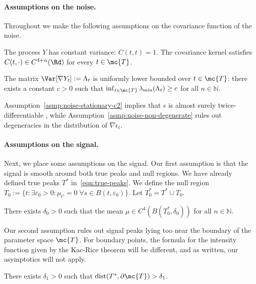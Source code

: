 \documentclass{article}
\newcommand{\ag}[1]{{\bf{{\red{[{AG: #1}]}}}}}
\begin{document}
	\paragraph{Assumptions on the noise.}
	Throughout we make the following assumptions on the covariance function of the noise. 
	\begin{assumption}
		\label{asmp:noise-stationary-c2}
		The process $Y$ has constant variance: $C(t,t) = 1$. The covariance kernel satisfies $C(t,\cdot) \in C^{4 + \alpha}(\Rd)$ for every $t \in \mc{T}$. 
	\end{assumption}
	\begin{assumption}
		\label{asmp:noise-non-degenerate}
		The matrix $\Var[\nabla Y_t] := \Lambda_t$ is uniformly lower bounded over $t \in \mc{T}$: there exists a constant $c > 0$ such that $\inf_{t \in \mc{T}} \lambda_{\min}(\Lambda_t) \geq c$ for all $n \in \mathbb{N}$.
	\end{assumption}
	Assumption~\ref{asmp:noise-stationary-c2} implies that $\epsilon$ is almost surely twice-differentiable \ag{Need to check this}, while Assumption~\ref{asmp:noise-non-degenerate} rules out degeneracies in the distribution of $\nabla \epsilon_t$. 
	
	\paragraph{Assumptions on the signal.}
	Next, we place some assumptions on the signal. Our first assumption is that the signal is smooth around both true peaks and null regions. We have already defined true peaks $T^{\ast}$ in~\eqref{eqn:true-peaks}. We define the null region $T_0 := \{t: \exists \varepsilon_0 > 0: \mu_{t'} = 0 \; \forall s \in B(t,\varepsilon_0)\}$. Let $T_0^{\ast} = T^{\ast} \cup T_0$.
	\begin{assumption}
		\label{asmp:signal-holder}
		There exists $\delta_0 > 0$ such that the mean $\mu \in C^{4}(B(T_0^{\ast},\delta_0))$ for all $n \in \mathbb{N}$.
	\end{assumption}
	Our second assumption rules out signal peaks lying too near the boundary of the parameter space $\mc{T}$. For boundary points, the formula for the intensity function given by the Kac-Rice theorem  will be different, and as written, our asymptotics will not apply.
	
	\begin{assumption}
		\label{asmp:signal-boundary}
		There exists $\delta_1 > 0$ such that ${\rm dist}(T^{\ast},\partial \mc{T}) > \delta_1$.
	\end{assumption}
	
\end{document}
